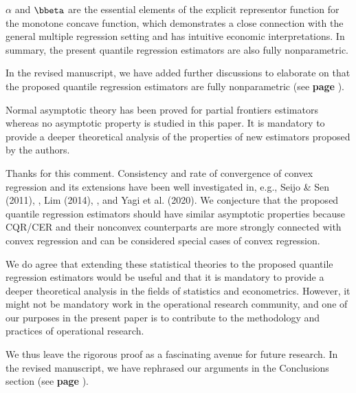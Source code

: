 \documentclass[12pt]{article}
\newcommand{\np}{\vskip 0.3cm}
\begin{document}
\begin{response}
$\alpha$ and $\bbeta$ are the essential elements of the explicit representor function for the monotone concave function, which demonstrates a close connection with the general multiple regression setting and has intuitive economic interpretations. In summary, the present quantile regression estimators are also fully nonparametric.\np

In the revised manuscript, we have added further discussions to elaborate on that the proposed quantile regression estimators are fully nonparametric (see \textbf{page }).
\end{response}


\np
\np
\np
\begin{sf}
{\blueb Normal asymptotic theory has been proved for partial frontiers estimators whereas no asymptotic property is studied in this paper. It is mandatory to provide a deeper theoretical analysis of the properties of new estimators proposed by the authors. }
\end{sf}
\begin{response}
Thanks for this comment. Consistency and rate of convergence of convex regression and its extensions have been well investigated in, e.g., Seijo \& Sen (2011), , Lim (2014), , and Yagi et al. (2020). We conjecture that the proposed quantile regression estimators should have similar asymptotic properties because CQR/CER and their nonconvex counterparts are more strongly connected with convex regression and can be considered special cases of convex regression. \np

We do agree that extending these statistical theories to the proposed quantile regression estimators would be useful and that it is mandatory to provide a deeper theoretical analysis in the fields of statistics and econometrics. However, it might not be mandatory work in the operational research community, and one of our purposes in the present paper is to contribute to the methodology and practices of operational research. \np

We thus leave the rigorous proof as a fascinating avenue for future research. In the revised manuscript, we have rephrased our arguments in the Conclusions section (see \textbf{page }).
\end{response}

\end{document}
